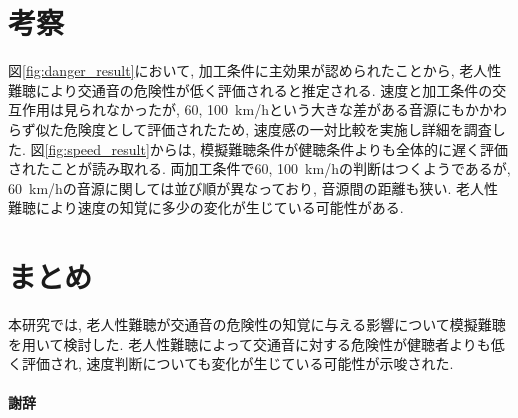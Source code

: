 \documentclass[10pt,twocolumn,uplatex,dvipdfmx]{jsarticle} %
\begin{document}
\vspace{-3truemm}


\section{考察}

図\ref{fig:danger_result}において, 加工条件に主効果が認められたことから, 老人性難聴により交通音の危険性が低く評価されると推定される.
速度と加工条件の交互作用は見られなかったが, 60, 100~km/hという大きな差がある音源にもかかわらず似た危険度として評価されたため, 速度感の一対比較を実施し詳細を調査した.
図\ref{fig:speed_result}からは, 模擬難聴条件が健聴条件よりも全体的に遅く評価されたことが読み取れる. 両加工条件で60, 100~km/hの判断はつくようであるが,  60~km/hの音源に関しては並び順が異なっており, 音源間の距離も狭い. 老人性難聴により速度の知覚に多少の変化が生じている可能性がある.



\section{まとめ}

本研究では, 老人性難聴が交通音の危険性の知覚に与える影響について模擬難聴を用いて検討した. 老人性難聴によって交通音に対する危険性が健聴者よりも低く評価され, 速度判断についても変化が生じている可能性が示唆された.

\paragraph{謝辞}
\end{document}
